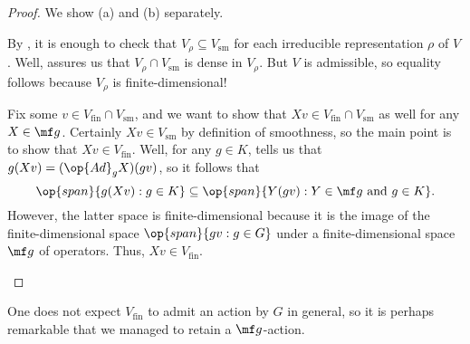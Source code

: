 \documentclass[../notes.tex]{subfiles}
\begin{document}
\begin{proof}
	We show (a) and (b) separately.
	\begin{listalph}
		\item By , it is enough to check that $V_\rho\subseteq V_{\mathrm{sm}}$ for each irreducible representation $\rho$ of $V$. Well,  assures us that $V_\rho\cap V_{\mathrm{sm}}$ is dense in $V_\rho$. But $V$ is admissible, so equality follows because $V_\rho$ is finite-dimensional!
		\item Fix some $v\in V_{\mathrm{fin}}\cap V_{\mathrm{sm}}$, and we want to show that $Xv\in V_{\mathrm{fin}}\cap V_{\mathrm{sm}}$ as well for any $X\in\mf g$. Certainly $Xv\in V_{\mathrm{sm}}$ by definition of smoothness, so the main point is to show that $Xv\in V_{\mathrm{fin}}$. Well, for any $g\in K$,  tells us that $g(Xv)=(\op{Ad}_gX)(gv)$, so it follows that
		\[\op{span}\{g(Xv):g\in K\}\subseteq\op{span}\{Y(gv):Y\in\mf g\text{ and }g\in K\}.\]
		However, the latter space is finite-dimensional because it is the image of the finite-dimensional space $\op{span}\{gv:g\in G\}$ under a finite-dimensional space $\mf g$ of operators. Thus, $Xv\in V_{\mathrm{fin}}$.
		\qedhere
	\end{listalph}
\end{proof}
\begin{remark}
	One does not expect $V_{\mathrm{fin}}$ to admit an action by $G$ in general, so it is perhaps remarkable that we managed to retain a $\mf g$-action.
\end{remark}
\end{document}
